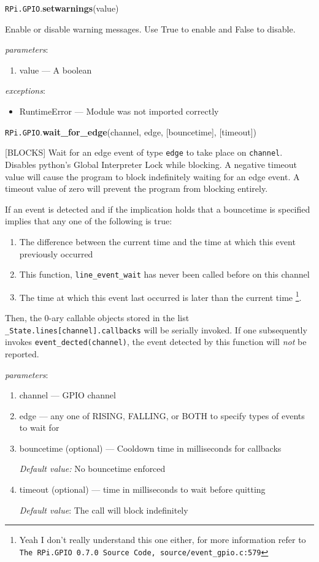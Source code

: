 \documentclass[12pt]{article}
\begin{document}
\noindent \texttt{RPi.GPIO}.\textbf{setwarnings}(value)
        
Enable or disable warning messages. Use True to enable and False to disable.
        
\textit{parameters}:
\begin{enumerate}      
        \item value --- A boolean
\end{enumerate}
 
 
\textit{exceptions}:
\begin{itemize}
    \item RuntimeError --- Module was not imported correctly 
\end{itemize}

\noindent \texttt{RPi.GPIO}.\textbf{wait\_for\_edge}(channel, edge, [bouncetime], [timeout])

[BLOCKS] Wait for an edge event of type \texttt{edge} to take place on \texttt{channel}. Disables python's Global Interpreter Lock while blocking. A negative timeout value will cause the program to block indefinitely waiting for an edge event. A timeout value of zero will prevent the program from blocking entirely.

If an event is detected and if the implication holds that a bouncetime is specified implies that any one of the following is true: 
\begin{enumerate}
    \item The difference between the current time and the time at which this event previously occurred
    \item This function, \texttt{line\_event\_wait} has never been called before on this channel
    \item The time at which this event last occurred is later than the current time \footnote{Yeah I don't really understand this one either, for more information refer to \texttt{The RPi.GPIO 0.7.0 Source Code, source/event\_gpio.c:579}\cite{rpigpio}}.
\end{enumerate}

Then, the 0-ary callable objects stored in the list \texttt{\_State.lines[channel].callbacks} will be serially invoked. If one subsequently invokes \texttt{event\_dected(channel)}, the event detected by this function will \textit{not} be reported.

\textit{parameters}:
\begin{enumerate}      
        \item channel --- GPIO channel
        \item edge --- any one of RISING, FALLING, or BOTH to specify types of events to wait for
        \item bouncetime (optional) --- Cooldown time in milliseconds for callbacks
        
        \textit{Default value:} No bouncetime enforced
        \item timeout (optional) --- time in milliseconds to wait before quitting
        
        \textit{Default value}: The call will block indefinitely
\end{enumerate}
 
\end{document}
